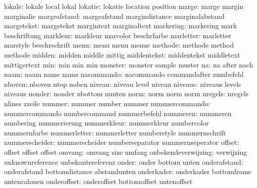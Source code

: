              lokale:  lokale               local               lokal
            lokatie:  lokatie              location            position
              marge:  marge                margin              marginalie
       margeafstand:  margeafstand         margindistance      marginalabstand
         margetekst:  margetekst           margintext          marginaltext
          markering:  markering            mark                beschriftung
           markleur:  markleur             marcolor            beschrfarbe
          marletter:  marletter            marstyle            beschrschrift
               menu:  menu                 menu                menue
            methode:  methode              method              methode
             midden:  midden               middle              mittig
        middentekst:  middentekst          middletext          mittigertext
                min:  min                  min                 min
            monster:  monster              sample              muster
                 na:  na                   after               nach
               naam:  naam                 name                name
         nacommando:  nacommando           commandafter        zumbefehl
             nboven:  nboven               ntop                noben
             niveau:  niveau               level               niveau
            niveaus:  niveaus              levels              niveaus
             nonder:  nonder               nbottom             nunten
               norm:  norm                 norm                norm
            nregels:  nregels              nlines              zzeile
             nummer:  nummer               number              nummer
     nummercommando:  nummercommando       numbercommand       nummerbefehl
           nummeren:  nummeren             numbering           nummerierung
        nummerkleur:  nummerkleur          numbercolor         nummernfarbe
       nummerletter:  nummerletter         numberstyle         nummernschrift
     nummerscheider:  nummerscheider       numberseparator     nummernseperator
             offset:  offset               offset              offset
             omvang:  omvang               size                umfang
onbekendeverwijzing:  verwijzing           unknownreference    unbekantereferenz
              onder:  onder                bottom              unten
       onderafstand:  onderafstand         bottomdistance      abstandunten
         onderkader:  onderkader           bottomframe         untenrahmen
        onderoffset:  onderoffset          bottomoffset        untenoffset
